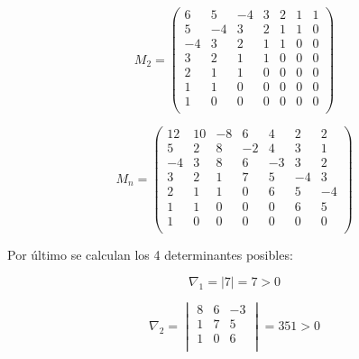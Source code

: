 \begin{equation}
    M_2 = \begin{pmatrix}
    6 & 5 & -4 & 3 & 2 & 1  & 1 \\
    5 & -4 & 3 & 2 & 1 & 1  & 0 \\
    -4 & 3 & 2 & 1  & 1& 0  & 0 \\
    3 & 2 & 1 & 1  & 0 & 0 & 0 \\
    2 & 1 & 1 & 0  & 0 & 0  & 0\\
    1 & 1 & 0 & 0  & 0 & 0  & 0 \\
    1 & 0 & 0 & 0  & 0 & 0 & 0  \\
            
    \end{pmatrix}
\end{equation}


\begin{equation}
    M_n = \begin{pmatrix}
    
    12 & 10 & -8 & 6 & 4 & 2  & 2 \\
    5 & 2 & 8 & -2 & 4 & 3  & 1 \\
    -4 & 3 & 8 & 6  & -3& 3  & 2 \\
    3 & 2 & 1 & 7  & 5 & -4 & 3 \\
    2 & 1 & 1 & 0  & 6 & 5  & -4\\
    1 & 1 & 0 & 0  & 0 & 6  & 5 \\
    1 & 0 & 0 & 0  & 0 & 0 & 0  \\
            
    \end{pmatrix}
\end{equation}

Por \'ultimo se calculan los 4 determinantes posibles:

\begin{equation}
    \nabla_1 = |7| = 7 > 0
\end{equation}

\begin{equation}
    \nabla_2  = \begin{vmatrix}
                8 & 6 & -3\\
                1 & 7 & 5\\
                1 & 0 & 6\\
                
                \end{vmatrix} = 351 > 0
\end{equation}

